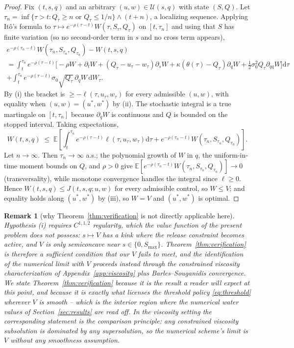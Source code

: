 \documentclass[pdflatex,sn-mathphys-num]{sn-jnl}
\theoremstyle{thmstyleone}
\theoremstyle{thmstyletwo}
\newtheorem{remark}[theorem]{Remark}
\theoremstyle{thmstylethree}
\newcommand{\dif}{\mathrm{d}}
\newcommand{\E}{\mathbb{E}}
\begin{document}
\begin{appendices}
\begin{proof}
Fix $(t,s,q)$ and an arbitrary $(u,w)\in\mathcal U(s,q)$ with state
$(S,Q)$. Let $\tau_n=\inf\{\tau>t: Q_\tau\ge n \text{ or } Q_\tau\le 1/n\}
\wedge (t+n)$, a localizing sequence. Applying It\^o's formula to
$\tau\mapsto e^{-\rho(\tau-t)}W(\tau,S_\tau,Q_\tau)$ on $[t,\tau_n]$ and
using that $S$ has finite variation (so no second-order term in $s$ and no
cross term appears),
\begin{multline*}
e^{-\rho(\tau_n-t)}W(\tau_n,S_{\tau_n},Q_{\tau_n}) - W(t,s,q) \\
= \int_t^{\tau_n} e^{-\rho(\tau-t)}\Big[
-\rho W + \partial_t W + (Q_\tau-u_\tau-w_\tau)\partial_s W
+ \kappa(\theta(\tau)-Q_\tau)\partial_q W
+ \tfrac12\sigma_0^2 Q_\tau \partial_{qq}W \Big]\dif\tau \\
+ \int_t^{\tau_n} e^{-\rho(\tau-t)}\sigma_0\sqrt{Q_\tau}\,\partial_q W\,\dif W_\tau .
\end{multline*}
By (i) the bracket is $\ge -\ell(\tau,u_\tau,w_\tau)$ for every admissible
$(u,w)$, with equality when $(u,w)=(u^*,w^*)$ by (ii). The stochastic
integral is a true martingale on $[t,\tau_n]$ because $\partial_q W$ is
continuous and $Q$ is bounded on the stopped interval. Taking expectations,
\[
W(t,s,q) \;\le\; \E\!\left[\int_t^{\tau_n} e^{-\rho(\tau-t)}
\ell(\tau,u_\tau,w_\tau)\dif\tau
+ e^{-\rho(\tau_n-t)}W(\tau_n,S_{\tau_n},Q_{\tau_n})\right].
\]
Let $n\to\infty$. Then $\tau_n\to\infty$ a.s.; the polynomial growth of $W$
in $q$, the uniform-in-time moment bounds on $Q$, and $\rho>0$ give
$\E[e^{-\rho(\tau_n-t)}W(\tau_n,S_{\tau_n},Q_{\tau_n})]\to0$ (transversality),
while monotone convergence handles the integral since $\ell\ge0$. Hence
$W(t,s,q)\le J(t,s,q;u,w)$ for every admissible control, so
$W\le V$; and equality holds along $(u^*,w^*)$ by (iii), so $W=V$ and
$(u^*,w^*)$ is optimal.
\end{proof}

\begin{remark}[why Theorem~\ref{thm:verification} is not directly applicable
here]
\label{rem:notsmooth}
Hypothesis (i) requires $C^{1,1,2}$ regularity, which the value function of
the present problem does not possess: $s\mapsto V$ has a kink where the
release constraint becomes active, and $V$ is only semiconcave near
$s\in\{0,S_{\max}\}$. Theorem~\ref{thm:verification} is therefore a
sufficient condition that our $V$ fails to meet, and the identification of
the numerical limit with $V$ proceeds instead through the constrained
viscosity characterization of Appendix~\ref{app:viscosity} plus
Barles--Souganidis convergence. We state
Theorem~\ref{thm:verification} because it is the result a reader will
expect at this point, and because it is exactly what licenses the
threshold policy \eqref{eq:threshold} wherever $V$ \emph{is} smooth -- which
is the interior region where the numerical water values of
Section~\ref{sec:results} are read off. In the viscosity setting the
corresponding statement is the comparison principle: any constrained
viscosity subsolution is dominated by any supersolution, so the numerical
scheme's limit is $V$ without any smoothness assumption.
\end{remark}


\end{appendices}
\end{document}
